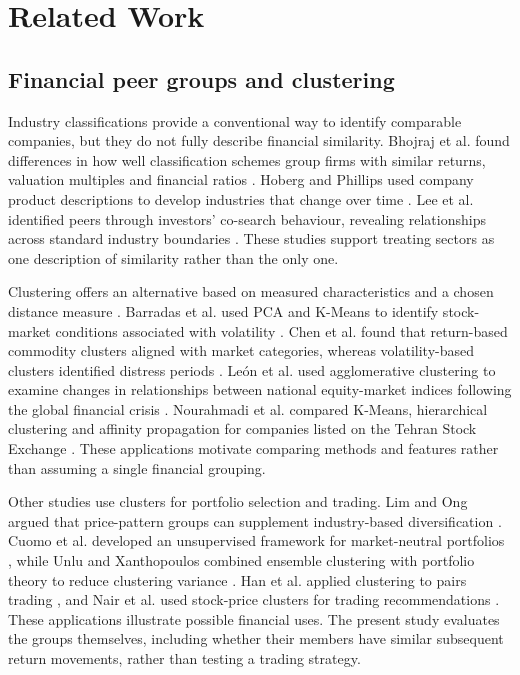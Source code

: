 \section{Related Work}

\subsection{Financial peer groups and clustering}

Industry classifications provide a conventional way to identify comparable companies, but they do not fully describe financial similarity. Bhojraj et al. found differences in how well classification schemes group firms with similar returns, valuation multiples and financial ratios \citep{bhojraj2003}. Hoberg and Phillips used company product descriptions to develop industries that change over time \citep{hoberg2016}. Lee et al. identified peers through investors' co-search behaviour, revealing relationships across standard industry boundaries \citep{lee2015}. These studies support treating sectors as one description of similarity rather than the only one.

Clustering offers an alternative based on measured characteristics and a chosen distance measure \citep{greene2008}. Barradas et al. used PCA and K-Means to identify stock-market conditions associated with volatility \citep{barradas2023}. Chen et al. found that return-based commodity clusters aligned with market categories, whereas volatility-based clusters identified distress periods \citep{chen2021}. Le\'{o}n et al. used agglomerative clustering to examine changes in relationships between national equity-market indices following the global financial crisis \citep{leon2017}. Nourahmadi et al. compared K-Means, hierarchical clustering and affinity propagation for companies listed on the Tehran Stock Exchange \citep{nourahmadi2022}. These applications motivate comparing methods and features rather than assuming a single financial grouping.

Other studies use clusters for portfolio selection and trading. Lim and Ong argued that price-pattern groups can supplement industry-based diversification \citep{lim2021}. Cuomo et al. developed an unsupervised framework for market-neutral portfolios \citep{cuomo2022}, while Unlu and Xanthopoulos combined ensemble clustering with portfolio theory to reduce clustering variance \citep{unlu2021}. Han et al. applied clustering to pairs trading \citep{han2023}, and Nair et al. used stock-price clusters for trading recommendations \citep{nair2017}. These applications illustrate possible financial uses. The present study evaluates the groups themselves, including whether their members have similar subsequent return movements, rather than testing a trading strategy.

